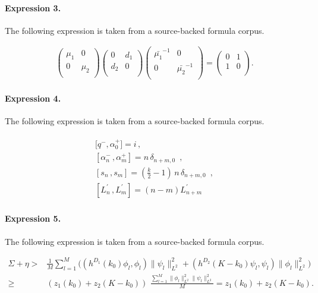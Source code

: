\documentclass[11pt]{article}
\begin{document}
\paragraph{Expression 3.} The following expression is taken from a source-backed formula corpus.

\begin{align*}\left(\begin{array}{cc} \mu_1 & 0 \\ 0 & \mu_2 \\ \end{array} \right)\left(\begin{array}{cc} 0 & d_1 \\ d_2 & 0 \\ \end{array} \right)\left(\begin{array}{cc}\bar{\mu_1}^{-1} & 0 \\0 & \bar{\mu_2}^{-1} \\\end{array}\right) =\left(\begin{array}{cc} 0 & 1 \\ 1 & 0 \\ \end{array} \right).\end{align*}

\paragraph{Expression 4.} The following expression is taken from a source-backed formula corpus.

\begin{align*}\begin{array}{l}\lbrack q^{-},\alpha _0^{+}]=i\,, \\\left[ \alpha _n^{-}\,,\alpha _m^{+}\right] =n\,\delta _{n+m,0}\,\,\,, \\\left[ s_n\,,s_m\right] =\left( \frac k2-1\right) \,n\,\delta _{n+m,0}\,\,\,,\\\left[ L_n^{\prime }\,,L_m^{\prime }\right] =(n-m)L_{n+m}^{\prime }\end{array}\end{align*}

\paragraph{Expression 5.} The following expression is taken from a source-backed formula corpus.

\begin{align*}\Sigma+\eta > &\frac{1}{M}\sum\limits_{l=1}^M\Big((h^{D_1}(k_0)\phi_l,\phi_l) \|\psi_l\|_{L^2}^2+(h^{D_2}(K-k_0)\psi_l,\psi_l) \|\phi_l\|_{L^2}^2\Big)\\\ge & (z_1(k_0) +z_2(K-k_0)) \,\, \frac{\sum\limits_{l=1}^M \|\phi_l\|_{L^2}^2 \|\psi_l\|_{L^2}^2 }{M}=z_1(k_0) +z_2(K-k_0).\end{align*}
\end{document}
